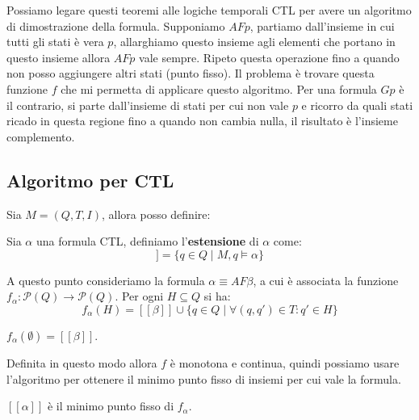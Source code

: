 Possiamo legare questi teoremi alle logiche temporali CTL per avere un algoritmo
di dimostrazione della formula. Supponiamo $AFp$, partiamo dall'insieme in cui
tutti gli stati è vera $p$, allarghiamo questo insieme agli elementi che portano in
questo insieme allora $AFp$ vale sempre. Ripeto questa operazione fino a quando
non posso aggiungere altri stati (punto fisso). Il problema è trovare questa
funzione $f$ che mi permetta di applicare questo algoritmo. Per una formula $Gp$
è il contrario, si parte dall'insieme di stati per cui non vale $p$ e ricorro da
quali stati ricado in questa regione fino a quando non cambia nulla, il risultato
è l'insieme complemento.
\subsection{Algoritmo per CTL}
Sia $M=(Q,T,I)$, allora posso definire:
\begin{definizione}
    Sia $\alpha$ una formula CTL, definiamo l'\textbf{estensione} di $\alpha$ come:
    \begin{equation}
        [[\alpha]] = \{q \in Q \mid M, q \models \alpha\}
    \end{equation}
\end{definizione}
A questo punto consideriamo la formula $\alpha \equiv A F \beta$, a cui è associata
la funzione $f_\alpha: \mathcal{P}(Q) \to \mathcal{P}(Q)$. Per ogni $H \subseteq Q$
si ha:
\begin{equation}
    f_\alpha(H) = [[\beta]] \cup \{q \in Q \mid \forall(q, q') \in T: q ' \in H\}
\end{equation}
\begin{osservazione}
    $f_\alpha (\emptyset) = [[\beta]]$.
\end{osservazione}
Definita in questo modo allora $f$ è monotona e continua, quindi possiamo usare
l'algoritmo per ottenere il minimo punto fisso di insiemi per cui vale la formula.
\begin{center}
    $[[\alpha]]$ è il minimo punto fisso di $f_\alpha$.
\end{center}

